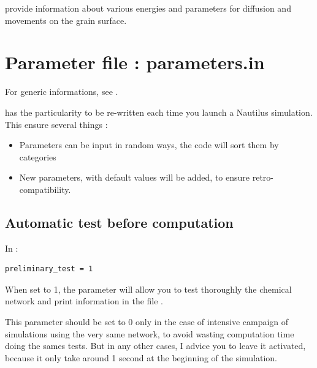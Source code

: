 \documentclass[english,a4paper,twoside]{article}
\begin{document}
 provide information about various energies and parameters for diffusion and movements on the grain surface.

\section{Parameter file : parameters.in}\label{sec:parameters_in}
For generic informations, see .

 has the particularity to be re-written each time you launch a Nautilus simulation. This ensure several things :
\begin{itemize}
\item Parameters can be input in random ways, the code will sort them by categories
\item New parameters, with default values will be added, to ensure retro-compatibility.
\end{itemize}

\subsection{Automatic test before computation}
In : 
\begin{verbatim}
preliminary_test = 1
\end{verbatim}

When set to 1, the parameter  will allow you to test thoroughly the chemical network and print information in the file . 

\begin{remarque}
This parameter should be set to 0 only in the case of intensive campaign of simulations using the very same network, to avoid wasting computation time doing the sames tests. But in any other cases, I advice you to leave it activated, because it only take around 1 second at the beginning of the simulation.
\end{remarque}
\end{document}
